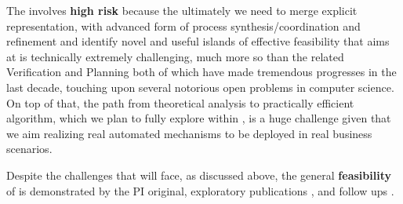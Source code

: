 The \project  involves \textbf{high risk} because the ultimately we need to merge explicit representation, with advanced form of process synthesis/coordination and refinement and  identify novel and useful islands of effective feasibility that \project aims at is technically extremely challenging, much more so than the related Verification and  Planning both of which have made tremendous progresses in the last decade, touching upon several notorious open problems in computer science. 
On top of that, the path from theoretical analysis to practically efficient algorithm, which we plan to fully explore within \project, is a huge challenge given that we aim realizing real automated mechanisms to be deployed in real business scenarios. 

Despite the challenges that \project will face, as discussed above, the general \textbf{feasibility} of \project is demonstrated by the PI original, exploratory publications \cite{DeVa13,DeVa15,DeVa16,DeGMGMM14,DePS13,DeGGPSS16}, and follow ups \cite{TorresB15,CamachoTMBM17}. 


